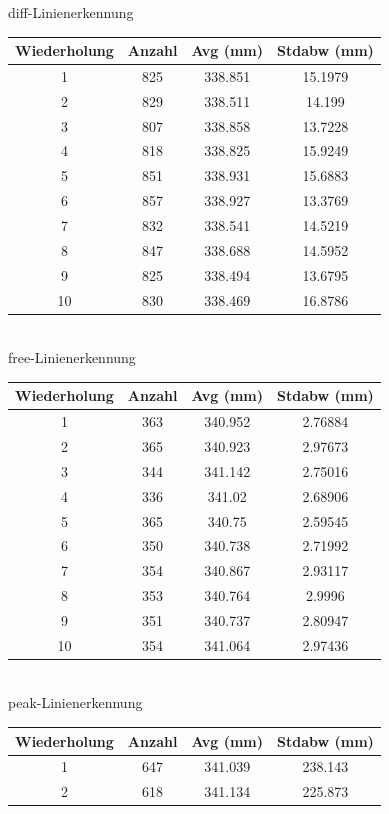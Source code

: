\documentclass[ngerman,a4paper,parskip=half]{scrartcl}
\begin{document}
\begin{table}[H]
	\centering
	diff-Linienerkennung \\
	\begin{tabular}{c|c|c|c}
		Wiederholung & Anzahl & Avg (mm) & Stdabw (mm) \\ \hline
		1 & 825 & 338.851 & 15.1979 \\
		2 & 829 & 338.511 & 14.199 \\
		3 & 807 & 338.858 & 13.7228 \\
		4 & 818 & 338.825 & 15.9249 \\
		5 & 851 & 338.931 & 15.6883 \\
		6 & 857 & 338.927 & 13.3769 \\
		7 & 832 & 338.541 & 14.5219 \\
		8 & 847 & 338.688 & 14.5952 \\
		9 & 825 & 338.494 & 13.6795 \\
		10 & 830 & 338.469 & 16.8786 \\
	\end{tabular} \\
	\vspace{1em}
	free-Linienerkennung \\
	\begin{tabular}{c|c|c|c}
		Wiederholung & Anzahl & Avg (mm) & Stdabw (mm) \\ \hline
		1 & 363 & 340.952 & 2.76884 \\
		2 & 365 & 340.923 & 2.97673 \\
		3 & 344 & 341.142 & 2.75016 \\
		4 & 336 & 341.02 & 2.68906 \\
		5 & 365 & 340.75 & 2.59545 \\
		6 & 350 & 340.738 & 2.71992 \\
		7 & 354 & 340.867 & 2.93117 \\
		8 & 353 & 340.764 & 2.9996 \\
		9 & 351 & 340.737 & 2.80947 \\
		10 & 354 & 341.064 & 2.97436 \\
	\end{tabular} \\
	\vspace{1em}
	peak-Linienerkennung \\
		\begin{tabular}{c|c|c|c}
		Wiederholung & Anzahl & Avg (mm) & Stdabw (mm) \\ \hline
		1 & 647 & 341.039 & 238.143 \\
		2 & 618 & 341.134 & 225.873 \\

\end{tabular}
\end{table}
\end{document}
